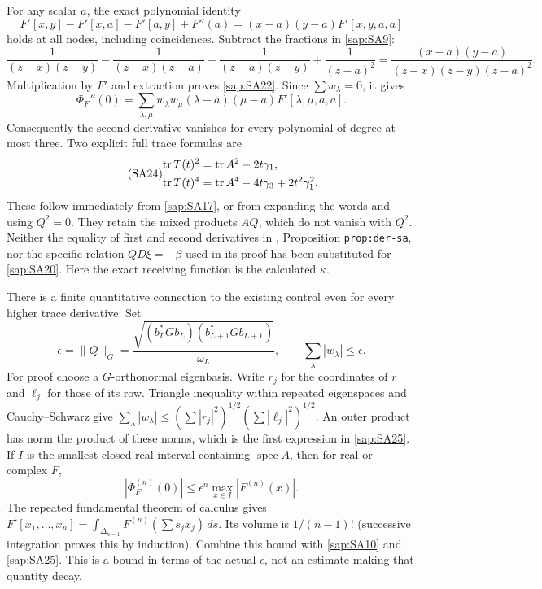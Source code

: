For any scalar $a$, the exact polynomial identity
\begin{equation}\tag{SA22}\label{sap:SA22}
F'[x,y]-F'[x,a]-F'[a,y]+F''(a)
=(x-a)(y-a)F'[x,y,a,a]
\end{equation}
holds at all nodes, including coincidences.
Subtract the fractions in \eqref{sap:SA9}:
\[
\frac1{(z-x)(z-y)}
-\frac1{(z-x)(z-a)}
-\frac1{(z-a)(z-y)}
+\frac1{(z-a)^2}
=\frac{(x-a)(y-a)}
       {(z-x)(z-y)(z-a)^2}.
\]
Multiplication by $F'$ and extraction proves
\eqref{sap:SA22}. Since $\sum w_\lambda=0$, it gives
\begin{equation}\tag{SA23}\label{sap:SA23}
\Phi_F''(0)=
\sum_{\lambda,\mu}w_\lambda w_\mu
(\lambda-a)(\mu-a)F'[\lambda,\mu,a,a].
\end{equation}
Consequently the second derivative vanishes for every
polynomial of degree at most three. Two explicit full
trace formulas are
\begin{equation}\tag{SA24}\label{sap:SA24}
\begin{split}
\operatorname{tr} T(t)^2&=\operatorname{tr} A^2-2t\gamma_1,\\
\operatorname{tr} T(t)^4&=\operatorname{tr} A^4-4t\gamma_3+2t^2\gamma_1^2 .
\end{split}
\end{equation}
These follow immediately from \eqref{sap:SA17}, or from
expanding the words and using $Q^2=0$. They retain the
mixed products $AQ$, which do not vanish with $Q^2$.
Neither the equality of first and second derivatives
in \cite{sap:CV}, Proposition \texttt{prop:der-sa}, nor the
specific relation $QD\xi=-\beta$ used in its proof has
been substituted for \eqref{sap:SA20}. Here the exact
receiving function is the calculated $\kappa$.

There is a finite quantitative connection to the existing
control even for every higher trace derivative. Set
\begin{equation}\tag{SA25}\label{sap:SA25}
\epsilon=\|Q\|_G
=\frac{\sqrt{(b_L^*Gb_L)(b_{L+1}^*Gb_{L+1})}}
 {\omega_L},\qquad
\sum_\lambda|w_\lambda|\leq\epsilon .
\end{equation}
For proof choose a $G$-orthonormal eigenbasis.
Write $r_j$ for the coordinates of $r$ and $\ell_j$ for
those of its row. Triangle inequality within repeated
eigenspaces and Cauchy--Schwarz give
$\sum_\lambda|w_\lambda|
\leq(\sum|r_j|^2)^{1/2}(\sum|\ell_j|^2)^{1/2}$.
An outer product has norm the product of these norms,
which is the first expression in \eqref{sap:SA25}.
If $I$ is the smallest closed real interval containing
$\operatorname{spec}A$, then for real or complex $F$,
\begin{equation}\tag{SA26}\label{sap:SA26}
|\Phi_F^{(n)}(0)|
\leq\epsilon^n\max_{x\in I}|F^{(n)}(x)|.
\end{equation}
The repeated fundamental theorem of calculus gives
$F'[x_1,\ldots,x_n]
=\int_{\Delta_{n-1}}F^{(n)}(\sum s_jx_j)\,ds$.
Its volume is $1/(n-1)!$ (successive integration proves
this by induction). Combine this bound with
\eqref{sap:SA10} and \eqref{sap:SA25}. This is a bound in terms
of the actual $\epsilon$, not an estimate making that
quantity decay.

